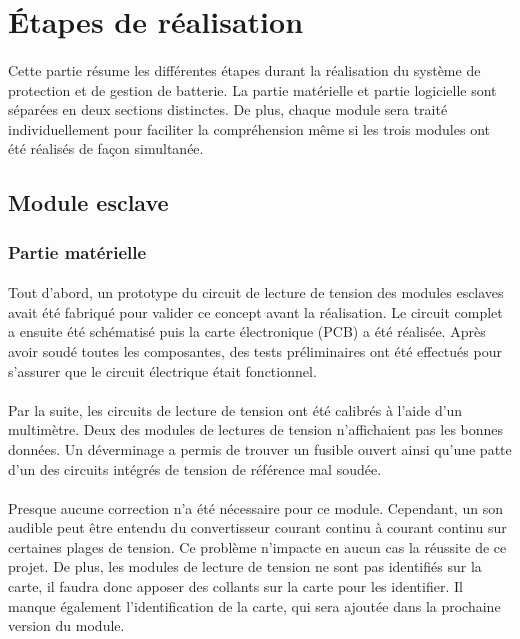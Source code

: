 \section{Étapes de réalisation}

	\paragraph{}
	Cette partie résume les différentes étapes durant la réalisation du système de protection et de gestion de batterie. La partie matérielle et partie logicielle sont séparées en deux sections distinctes. De plus, chaque module sera traité individuellement pour faciliter la compréhension même si les trois modules ont été réalisés de façon simultanée.

	\subsection{Module esclave}

		\subsubsection{Partie matérielle}

			\paragraph{}
			Tout d’abord, un prototype du circuit de lecture de tension des modules esclaves avait été fabriqué pour valider ce concept avant la réalisation. Le circuit complet a ensuite été schématisé puis la carte électronique (PCB) a été réalisée. Après avoir soudé toutes les composantes, des tests préliminaires ont été effectués pour s’assurer que le circuit électrique était fonctionnel.

			\paragraph{}
			Par la suite, les circuits de lecture de tension ont été calibrés à l’aide d’un multimètre. Deux des modules de lectures de tension n’affichaient pas les bonnes données. Un déverminage a permis de trouver un fusible ouvert ainsi qu'une patte d'un des circuits intégrés de tension de référence mal soudée.

			\paragraph{}
			Presque aucune correction n’a été nécessaire pour ce module. Cependant, un son audible peut être entendu du convertisseur courant continu à courant continu sur certaines plages de tension. Ce problème n’impacte en aucun cas la réussite de ce projet. De plus, les modules de lecture de tension ne sont pas identifiés sur la carte, il faudra donc apposer des collants sur la carte pour les identifier. Il manque également l’identification de la carte, qui sera ajoutée dans la prochaine version du module.

